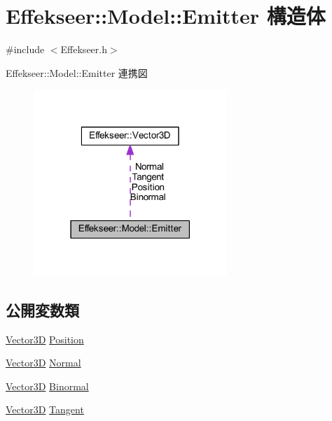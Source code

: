 \hypertarget{struct_effekseer_1_1_model_1_1_emitter}{}\section{Effekseer\+:\+:Model\+:\+:Emitter 構造体}
\label{struct_effekseer_1_1_model_1_1_emitter}


{\ttfamily \#include $<$Effekseer.\+h$>$}



Effekseer\+:\+:Model\+:\+:Emitter 連携図\nopagebreak
\begin{figure}[H]
\begin{center}
\leavevmode
\includegraphics[width=207pt]{struct_effekseer_1_1_model_1_1_emitter__coll__graph}
\end{center}
\end{figure}
\subsection*{公開変数類}
\begin{DoxyCompactItemize}
\item 
\mbox{\hyperlink{struct_effekseer_1_1_vector3_d}{Vector3D}} \mbox{\hyperlink{struct_effekseer_1_1_model_1_1_emitter_a6279424ea82c1cabc2c5b406f018f790}{Position}}
\item 
\mbox{\hyperlink{struct_effekseer_1_1_vector3_d}{Vector3D}} \mbox{\hyperlink{struct_effekseer_1_1_model_1_1_emitter_a98f905f6c2908fd65aedefc975be677a}{Normal}}
\item 
\mbox{\hyperlink{struct_effekseer_1_1_vector3_d}{Vector3D}} \mbox{\hyperlink{struct_effekseer_1_1_model_1_1_emitter_a092f55d411ff30e52ce759ecc4c2709d}{Binormal}}
\item 
\mbox{\hyperlink{struct_effekseer_1_1_vector3_d}{Vector3D}} \mbox{\hyperlink{struct_effekseer_1_1_model_1_1_emitter_ab4f98e69e1041c999f0f191891fcb140}{Tangent}}
\end{DoxyCompactItemize}


